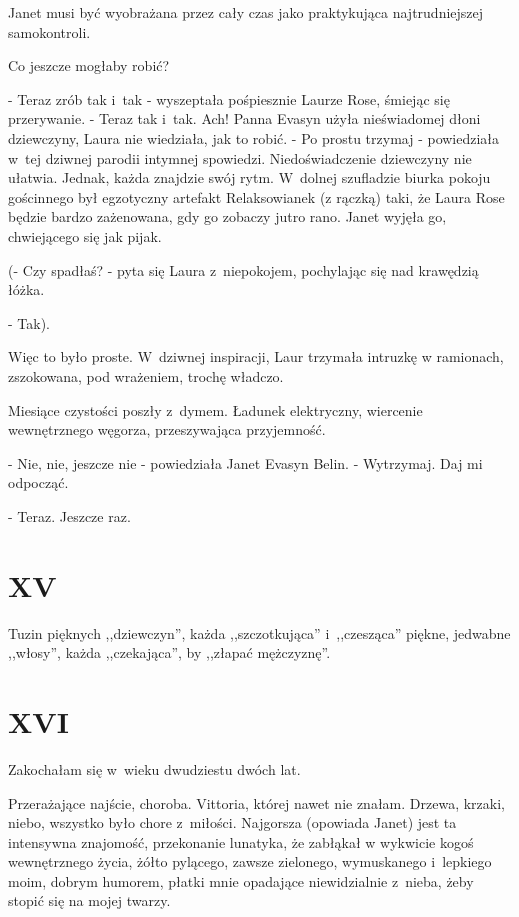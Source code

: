 \documentclass[oneside,polish,12pt,sfheadings]{mwbk}
\begin{document}
Janet musi być wyobrażana przez cały czas jako praktykująca najtrudniejszej
samokontroli.

Co jeszcze mogłaby robić?

- Teraz zrób tak i~tak - wyszeptała pośpiesznie Laurze Rose, śmiejąc
się przerywanie. - Teraz tak i~tak. Ach! Panna Evasyn użyła nieświadomej
dłoni dziewczyny, Laura nie wiedziała, jak to robić. - Po prostu trzymaj
- powiedziała w~tej dziwnej parodii intymnej spowiedzi. Niedoświadczenie
dziewczyny nie ułatwia. Jednak, każda znajdzie swój rytm. W~dolnej
szufladzie biurka pokoju gościnnego był egzotyczny artefakt Relaksowianek
(z rączką) taki, że Laura Rose będzie bardzo zażenowana, gdy go zobaczy
jutro rano. Janet wyjęła go, chwiejącego się jak pijak.

(- Czy spadłaś? - pyta się Laura z~niepokojem, pochylając się nad
krawędzią łóżka.

- Tak).

Więc to było proste. W~dziwnej inspiracji, Laur trzymała intruzkę
w ramionach, zszokowana, pod wrażeniem, trochę władczo.

Miesiące czystości poszły z~dymem. Ładunek elektryczny, wiercenie
wewnętrznego węgorza, przeszywająca przyjemność.

- Nie, nie, jeszcze nie - powiedziała Janet Evasyn Belin. - Wytrzymaj.
Daj mi odpocząć.

- Teraz. Jeszcze raz.

\chapter{XV}

Tuzin pięknych ,,dziewczyn'', każda ,,szczotkująca'' i~,,czesząca''
piękne, jedwabne ,,włosy'', każda ,,czekająca'', by ,,złapać mężczyznę''.

\chapter{XVI}

Zakochałam się w~wieku dwudziestu dwóch lat.

Przerażające najście, choroba. Vittoria, której nawet nie znałam.
Drzewa, krzaki, niebo, wszystko było chore z~miłości. Najgorsza (opowiada
Janet) jest ta intensywna znajomość, przekonanie lunatyka, że zabłąkał
w wykwicie kogoś wewnętrznego życia, żółto pylącego, zawsze zielonego,
wymuskanego i~lepkiego moim, dobrym humorem, płatki mnie opadające
niewidzialnie z~nieba, żeby stopić się na mojej twarzy.
\end{document}
